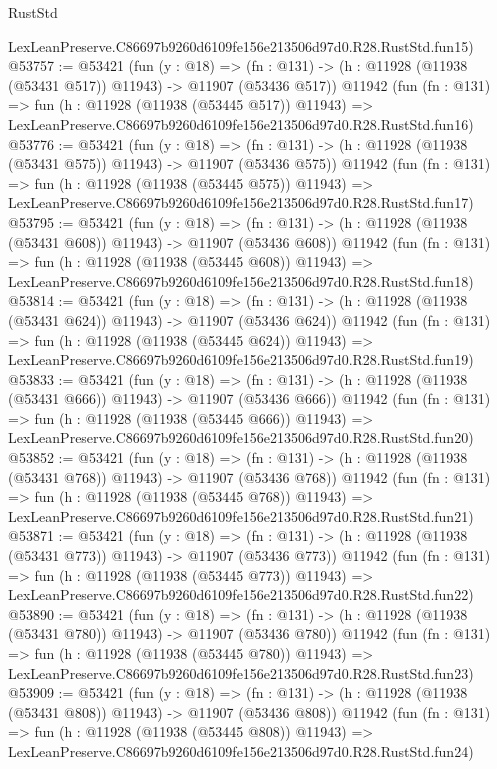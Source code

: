 \begin{lexlean}{RustStd}
\begin{coremodule}
    LexLeanPreserve.C86697b9260d6109fe156e213506d97d0.R28.RustStd.fun15)
@53757 := @53421
    (fun (y : @18) =>
    (fn : @131) -> (h : @11928 (@11938 (@53431 @517)) @11943) -> @11907 (@53436 @517))
    @11942
    (fun (fn : @131) =>
    fun (h : @11928 (@11938 (@53445 @517)) @11943) =>
    LexLeanPreserve.C86697b9260d6109fe156e213506d97d0.R28.RustStd.fun16)
@53776 := @53421
    (fun (y : @18) =>
    (fn : @131) -> (h : @11928 (@11938 (@53431 @575)) @11943) -> @11907 (@53436 @575))
    @11942
    (fun (fn : @131) =>
    fun (h : @11928 (@11938 (@53445 @575)) @11943) =>
    LexLeanPreserve.C86697b9260d6109fe156e213506d97d0.R28.RustStd.fun17)
@53795 := @53421
    (fun (y : @18) =>
    (fn : @131) -> (h : @11928 (@11938 (@53431 @608)) @11943) -> @11907 (@53436 @608))
    @11942
    (fun (fn : @131) =>
    fun (h : @11928 (@11938 (@53445 @608)) @11943) =>
    LexLeanPreserve.C86697b9260d6109fe156e213506d97d0.R28.RustStd.fun18)
@53814 := @53421
    (fun (y : @18) =>
    (fn : @131) -> (h : @11928 (@11938 (@53431 @624)) @11943) -> @11907 (@53436 @624))
    @11942
    (fun (fn : @131) =>
    fun (h : @11928 (@11938 (@53445 @624)) @11943) =>
    LexLeanPreserve.C86697b9260d6109fe156e213506d97d0.R28.RustStd.fun19)
@53833 := @53421
    (fun (y : @18) =>
    (fn : @131) -> (h : @11928 (@11938 (@53431 @666)) @11943) -> @11907 (@53436 @666))
    @11942
    (fun (fn : @131) =>
    fun (h : @11928 (@11938 (@53445 @666)) @11943) =>
    LexLeanPreserve.C86697b9260d6109fe156e213506d97d0.R28.RustStd.fun20)
@53852 := @53421
    (fun (y : @18) =>
    (fn : @131) -> (h : @11928 (@11938 (@53431 @768)) @11943) -> @11907 (@53436 @768))
    @11942
    (fun (fn : @131) =>
    fun (h : @11928 (@11938 (@53445 @768)) @11943) =>
    LexLeanPreserve.C86697b9260d6109fe156e213506d97d0.R28.RustStd.fun21)
@53871 := @53421
    (fun (y : @18) =>
    (fn : @131) -> (h : @11928 (@11938 (@53431 @773)) @11943) -> @11907 (@53436 @773))
    @11942
    (fun (fn : @131) =>
    fun (h : @11928 (@11938 (@53445 @773)) @11943) =>
    LexLeanPreserve.C86697b9260d6109fe156e213506d97d0.R28.RustStd.fun22)
@53890 := @53421
    (fun (y : @18) =>
    (fn : @131) -> (h : @11928 (@11938 (@53431 @780)) @11943) -> @11907 (@53436 @780))
    @11942
    (fun (fn : @131) =>
    fun (h : @11928 (@11938 (@53445 @780)) @11943) =>
    LexLeanPreserve.C86697b9260d6109fe156e213506d97d0.R28.RustStd.fun23)
@53909 := @53421
    (fun (y : @18) =>
    (fn : @131) -> (h : @11928 (@11938 (@53431 @808)) @11943) -> @11907 (@53436 @808))
    @11942
    (fun (fn : @131) =>
    fun (h : @11928 (@11938 (@53445 @808)) @11943) =>
    LexLeanPreserve.C86697b9260d6109fe156e213506d97d0.R28.RustStd.fun24)

\end{coremodule}
\end{lexlean}
